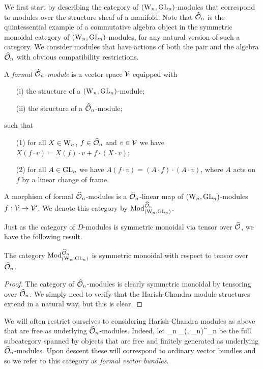 We first start by describing the category of $({{\rm W}_n}, {\rm GL}_n)$-modules
that correspond to modules over the structure sheaf of a manifold. Note that $\widehat{\mathcal O}_n$ is the quintessential example of a commutative algebra object in the symmetric monoidal category of $({{\rm W}_n},{\rm GL}_n)$-modules, 
for any natural version of such a category. We consider modules that
have actions of both the pair and the algebra $\widehat{\mathcal O}_n$ with obvious
compatibility restrictions. 

\begin{dfn} A {\em formal $\widehat{\mathcal O}_n$-module} is a
  vector space $\mathcal{V}$ equipped with
\begin{itemize}
\item[(i)] the structure of a $({{\rm W}_n}, {\rm GL}_n)$-module;
\item[(ii)] the structure of a $\widehat{\mathcal O}_n$-module;
\end{itemize}
such that 
\begin{itemize}
\item[(1)] for all $X \in {{\rm W}_n}$, $f \in \widehat{\mathcal O}_n$ and $v \in \mathcal{V}$ we
  have $X(f \cdot v) = X(f) \cdot v + f \cdot (X \cdot v)$;
\item[(2)] for all $A \in {\rm GL}_n$ we have $A (f \cdot v) = (A \cdot f) \cdot (A \cdot v)$,  where $A$ acts on $f$ by a linear change of frame.
\end{itemize}
A morphism of formal $\widehat{\mathcal O}_n$-modules is a $\widehat{\mathcal O}_n$-linear map of
$({{\rm W}_n}, {\rm GL}_n)$-modules $f : \mathcal{V} \to \mathcal{V}'$. We denote this category
by ${\rm Mod}_{({{\rm W}_n}, {\rm GL}_n)}^{\widehat{\mathcal O}_n}$. 
\end{dfn}

Just as the category of $D$-modules is symmetric monoidal via tensor over $\widehat{\mathcal O}$, we have the following result.

\begin{lem}
The category ${\rm Mod}^{\widehat{\mathcal O}_n}_{({{\rm W}_n}, {\rm GL}_n)}$ is symmetric monoidal with respect to tensor over $\widehat{\mathcal O}_n$.
\end{lem} 

\begin{proof}
The category of $\widehat{\mathcal O}_n$-modules is clearly symmetric monoidal by tensoring over $\widehat{\mathcal O}_n$. We simply need to verify that the Harish-Chandra module structures extend in a natural way, but this is clear.
\end{proof}

We will often restrict ourselves to considering Harish-Chandra modules as above that are free as underlying $\widehat{\mathcal O}_n$-modules. 
Indeed, let
\ben
\VB_n \subset \Mod_{(\Vect, \GL_n)}^{\hO_n}
\een
be the full subcategory spanned by objects that are free and finitely generated as underlying $\widehat{\mathcal O}_n$-modules. 
Upon descent these will correspond to ordinary vector bundles and so
we refer to this category as {\em formal vector bundles}. 


